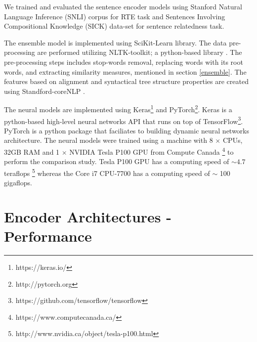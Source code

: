 \documentclass[12pt]{report} %
\begin{document}
  We trained and evaluated the sentence encoder models using Stanford Natural Language Inference (SNLI) corpus \citep{bowman2015large} for RTE task and Sentences Involving Compositional Knowledge (SICK) \citep{marelli2014semeval} data-set for sentence relatedness task. 
 
  The ensemble model is implemented using SciKit-Learn library. The data pre-processing are performed utilizing NLTK-toolkit; a python-based library \citep{bird2004nltk}. The pre-processing steps includes stop-words removal, replacing words with its root words, and extracting similarity measures, mentioned in section \ref{ensemble}. The features based on alignment and syntactical tree structure properties are created using Standford-coreNLP \citep{manning2014stanford}.
  
   The neural models are implemented using Keras\footnote{https://keras.io/} and PyTorch\footnote{http://pytorch.org}. Keras is a python-based high-level neural networks API that runs on top of TensorFlow\footnote{https://github.com/tensorflow/tensorflow}. PyTorch is a python package that faciliates to building dynamic neural networks architecture. The neural models were trained using a machine with 8 $\times$ CPUs, 32GB RAM and 1 $\times$ NVIDIA Tesla P100 GPU from Compute Canada \footnote{https://www.computecanada.ca/} to perform the comparison study. Tesla P100 GPU has a computing speed of $\sim 4.7$ teraflops \footnote{http://www.nvidia.ca/object/tesla-p100.html} whereas the Core i7 CPU-7700 has a computing speed of $\sim$ 100 gigaflops.
 
 
 


\section{Encoder Architectures - Performance}

\label{performance}
\end{document}
